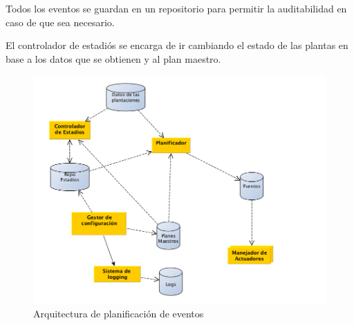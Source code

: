 Todos los eventos se guardan en un repositorio para permitir la auditabilidad en caso de que sea necesario. 

El controlador de estadiós se encarga de ir cambiando el estado de las plantas en base a los datos que se obtienen y al plan maestro.

\begin{figure}[h!]
  \centering
  \includegraphics[width=1\textwidth]{./images/arq_plan.png}
  \caption{Arquitectura de planificación de eventos}
  \label{fig:clases4}
\end{figure}
